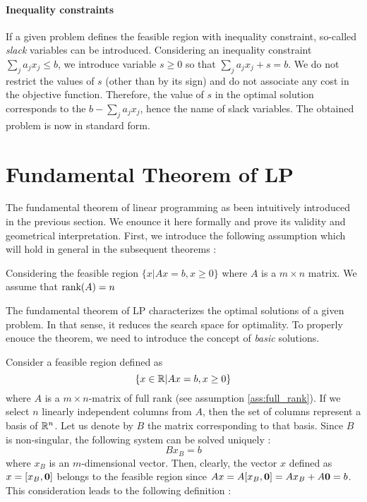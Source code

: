 \paragraph{Inequality constraints}
If a given problem defines the feasible region with inequality constraint, so-called \textit{slack} variables can be introduced. Considering an inequality constraint $\sum_j a_jx_j \le b$, we introduce variable $s\ge 0$ so that $\sum_j a_jx_j + s = b$. We do not restrict the values of $s$ (other than by its sign) and do not associate any cost in the objective function. Therefore, the value of $s$ in the optimal solution corresponds to the $b-\sum_j a_jx_j$, hence the name of slack variables. The obtained problem is now in standard form. 

\section{Fundamental Theorem of LP}
\label{sec:fonda_th}

The fundamental theorem of linear programming as been intuitively introduced in the previous section. We enounce it here formally and prove its validity and geometrical interpretation. First, we introduce the following assumption which will hold in general in the subsequent theorems :

\begin{assumption}
    \label{ass:full_rank}
    Considering the feasible region $\{x|Ax = b, x\ge 0\}$ where $A$ is a $m\times n$ matrix. We assume that $\textrm{rank}(A)=n$
\end{assumption}

The fundamental theorem of LP characterizes the optimal solutions of a given problem. In that sense, it reduces the search space for optimality. To properly enouce the theorem, we need to introduce the concept of \textit{basic} solutions.

Consider a feasible region defined as \[ \{ x\in\mathbb R | Ax = b, x\ge 0 \} \] where $A$ is a $m\times n$-matrix of full rank (see assumption \ref{ass:full_rank}). If we select $n$ linearly independent columns from $A$, then the set of columns represent a basis of $\mathbb R^n$. Let us denote by $B$ the matrix corresponding to that basis. Since $B$ is non-singular, the following system can be solved uniquely :
\[ Bx_B = b \] where $x_B$ is an $m$-dimensional vector. Then, clearly, the vector $x$ defined as $x = [x_B, \textbf 0]$ belongs to the feasible region since $Ax = A[x_B, \textbf 0] = Ax_B + A\textbf 0 = b$. This consideration leads to the following definition :

